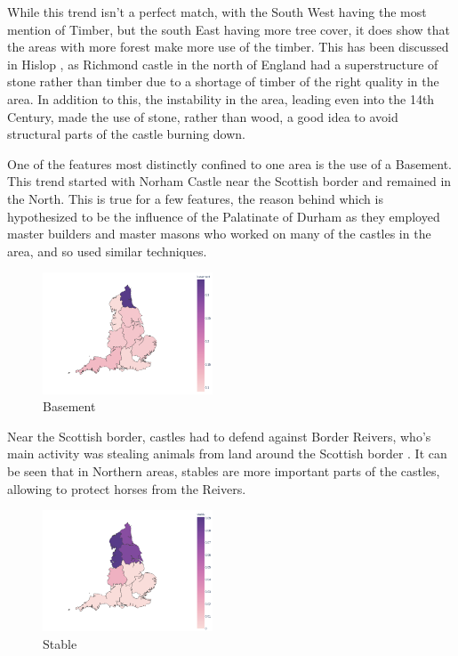 \documentclass[12pt]{article}
\begin{document}
While this trend isn't a perfect match, with the South West having the most mention of Timber, but the south East having more tree cover, it does show that the areas with more forest make more use of the timber. This has been discussed in Hislop \cite{HislopMalcolm2016Cb:a}, as Richmond castle in the north of England had a superstructure of stone rather than timber due to a shortage of timber of the right quality in the area. In addition to this, the instability in the area, leading even into the 14th Century, made the use of stone, rather than wood, a good idea to avoid structural parts of the castle burning down.

One of the features most distinctly confined to one area is the use of a Basement. This trend started with Norham Castle near the Scottish border \cite{HislopMalcolm2016Cb:a} and remained in the North. This is true for a few features, the reason behind which is hypothesized to be the influence of the Palatinate of Durham \cite[p6]{HislopMalcolm2016Cb:a} as they employed master builders and master masons who worked on many of the castles in the area, and so used similar techniques.

\begin{figure}[H]
	\centering
	\includegraphics[width=0.45\textwidth]{basement.png}
	\caption{Basement}
\end{figure}



Near the Scottish border, castles had to defend against Border Reivers, who's main activity was stealing animals from land around the Scottish border \cite{moffat2011reivers}. It can be seen that in Northern areas, stables are more important parts of the castles, allowing to protect horses from the Reivers.

\begin{figure}[H]
	\centering
	\includegraphics[width=0.45\textwidth]{stable.png}
	\caption{Stable}
\end{figure}
\end{document}
